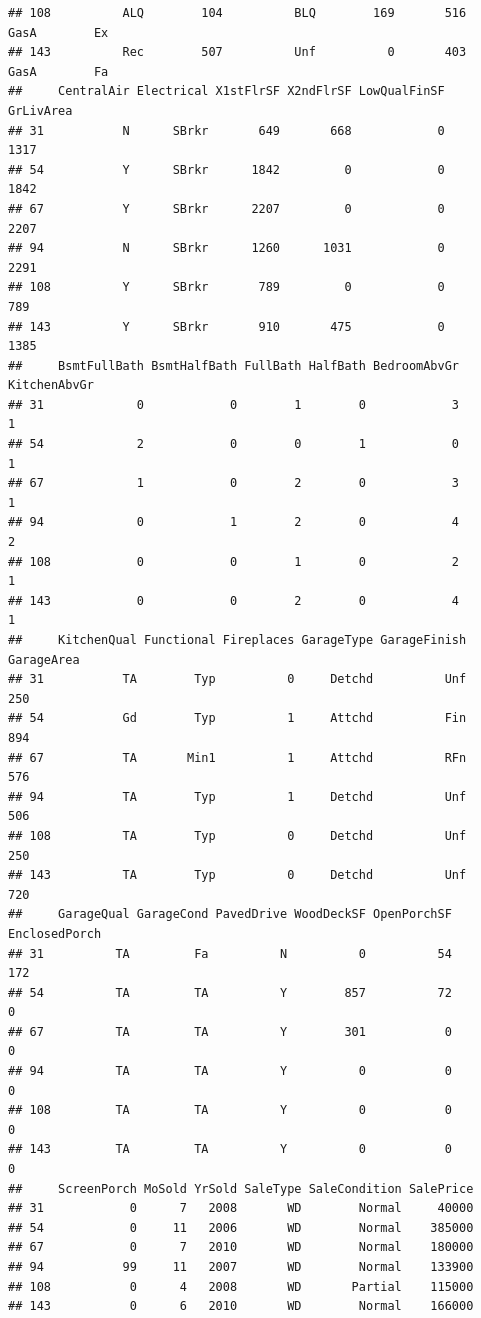 \documentclass[
]{article}
\begin{document}
\begin{verbatim}
## 108          ALQ        104          BLQ        169       516    GasA        Ex
## 143          Rec        507          Unf          0       403    GasA        Fa
##     CentralAir Electrical X1stFlrSF X2ndFlrSF LowQualFinSF GrLivArea
## 31           N      SBrkr       649       668            0      1317
## 54           Y      SBrkr      1842         0            0      1842
## 67           Y      SBrkr      2207         0            0      2207
## 94           N      SBrkr      1260      1031            0      2291
## 108          Y      SBrkr       789         0            0       789
## 143          Y      SBrkr       910       475            0      1385
##     BsmtFullBath BsmtHalfBath FullBath HalfBath BedroomAbvGr KitchenAbvGr
## 31             0            0        1        0            3            1
## 54             2            0        0        1            0            1
## 67             1            0        2        0            3            1
## 94             0            1        2        0            4            2
## 108            0            0        1        0            2            1
## 143            0            0        2        0            4            1
##     KitchenQual Functional Fireplaces GarageType GarageFinish GarageArea
## 31           TA        Typ          0     Detchd          Unf        250
## 54           Gd        Typ          1     Attchd          Fin        894
## 67           TA       Min1          1     Attchd          RFn        576
## 94           TA        Typ          1     Detchd          Unf        506
## 108          TA        Typ          0     Detchd          Unf        250
## 143          TA        Typ          0     Detchd          Unf        720
##     GarageQual GarageCond PavedDrive WoodDeckSF OpenPorchSF EnclosedPorch
## 31          TA         Fa          N          0          54           172
## 54          TA         TA          Y        857          72             0
## 67          TA         TA          Y        301           0             0
## 94          TA         TA          Y          0           0             0
## 108         TA         TA          Y          0           0             0
## 143         TA         TA          Y          0           0             0
##     ScreenPorch MoSold YrSold SaleType SaleCondition SalePrice
## 31            0      7   2008       WD        Normal     40000
## 54            0     11   2006       WD        Normal    385000
## 67            0      7   2010       WD        Normal    180000
## 94           99     11   2007       WD        Normal    133900
## 108           0      4   2008       WD       Partial    115000
## 143           0      6   2010       WD        Normal    166000
\end{verbatim}
\end{document}
